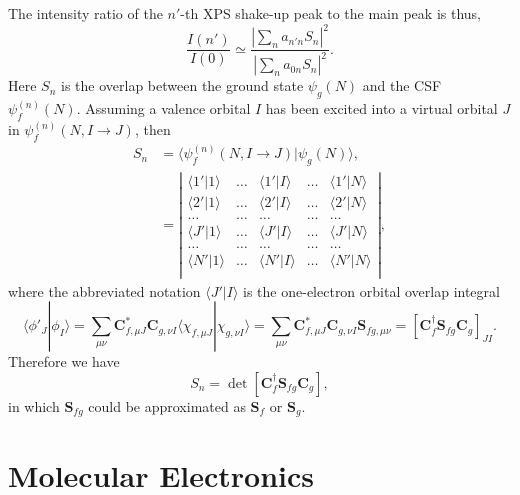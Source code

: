 \documentclass[a4paper,11pt,twoside,openright]{book}
\begin{document}
The intensity ratio of the $n'$-th XPS shake-up peak to the main peak is thus\cite{Martin-JCP64-3685},
\begin{equation}
  \frac{I(n')}{I(0)}\simeq\frac{|\sum_{n}a_{n'n}S_{n}|^2}{|\sum_{n}a_{0n}S_{n}|^2}.
\end{equation}
Here $S_{n}$ is the overlap between the ground state $\psi_{g}(N)$ and the CSF $\psi_{f}^{(n)}(N)$.
Assuming a valence orbital $I$ has been excited into a virtual orbital $J$ in $\psi_{f}^{(n)}(N,I\rightarrow J)$,
then
\begin{align}
   \label{eq-shakeup-overlap}
  S_{n}
  &=\langle\psi_{f}^{(n)}(N,I\rightarrow J)|\psi_{g}(N)\rangle,\\
  &=\left|\begin{array}{ccccc}
    \langle1'|1\rangle & \dots & \langle1'|I\rangle & \dots & \langle1'|N\rangle\\
    \langle2'|1\rangle & \dots & \langle2'|I\rangle & \dots & \langle2'|N\rangle\\
    \dots & \dots & \dots & \dots & \dots\\
    \langle J'|1\rangle & \dots & \langle J'|I\rangle & \dots & \langle J'|N\rangle\\
    \dots & \dots & \dots & \dots & \dots\\
    \langle N'|1\rangle & \dots & \langle N'|I\rangle & \dots & \langle N'|N\rangle\\
   \end{array}\right|,\nonumber
\end{align}
where the abbreviated notation $\langle J'|I\rangle$ is the one-electron orbital overlap integral
\begin{equation}
  \langle\phi'_{J}|\phi_{I}\rangle
    =\sum_{\mu\nu}\mathbf{C}^{*}_{f,\mu J}\mathbf{C}_{g,\nu I}\langle\chi_{f,\mu J}|\chi_{g,\nu I}\rangle
    =\sum_{\mu\nu}\mathbf{C}^{*}_{f,\mu J}\mathbf{C}_{g,\nu I}\mathbf{S}_{fg,\mu\nu}
    =\left[\mathbf{C}_{f}^{\dagger}\mathbf{S}_{fg}\mathbf{C}_{g}\right]_{JI}.
\end{equation}
Therefore we have
\begin{equation}
  S_{n}=\det\left[\mathbf{C}_{f}^{\dagger}\mathbf{S}_{fg}\mathbf{C}_{g}\right],
\end{equation}
in which $\mathbf{S}_{fg}$ could be approximated as $\mathbf{S}_{f}$ or $\mathbf{S}_{g}$.

\chapter{Molecular Electronics}
\label{chapter-molecular-electronics}
\end{document}
